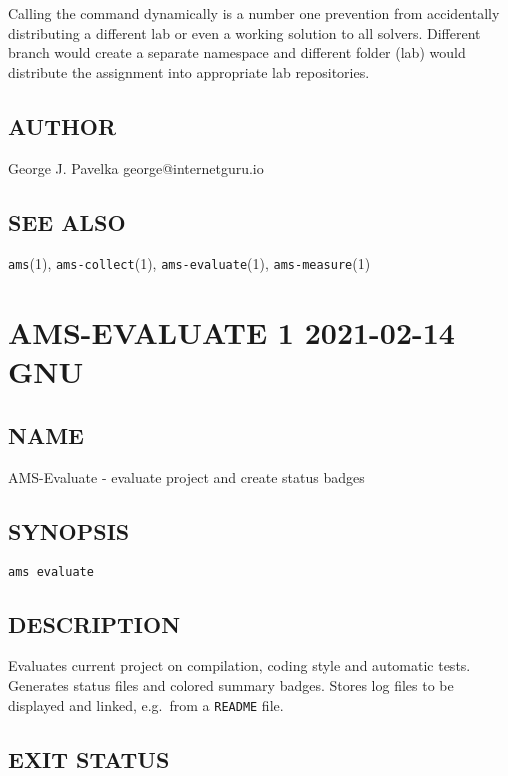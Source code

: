 Calling the command dynamically is a number one prevention from accidentally distributing a different lab or even a working solution to all solvers. Different branch would create a separate namespace and different folder (lab) would distribute the assignment into appropriate lab repositories.

\subsection{AUTHOR}\label{author-2}

George J. Pavelka george@internetguru.io

\subsection{SEE ALSO}\label{see-also-2}

\texttt{ams}(1), \texttt{ams-collect}(1), \texttt{ams-evaluate}(1), \texttt{ams-measure}(1)

\section{AMS-EVALUATE 1 2021-02-14 GNU}\label{ams-evaluate-1-2021-02-14-gnu-user-manuals}

\subsection{NAME}\label{name-3}

AMS-Evaluate - evaluate project and create status badges

\subsection{SYNOPSIS}\label{synopsis-3}

\texttt{ams\ evaluate}

\subsection{DESCRIPTION}\label{description-3}

Evaluates current project on compilation, coding style and automatic tests. Generates status files and colored summary badges. Stores log files to be displayed and linked, e.g.~from a \texttt{README} file.

\subsection{EXIT STATUS}\label{exit-status-3}

